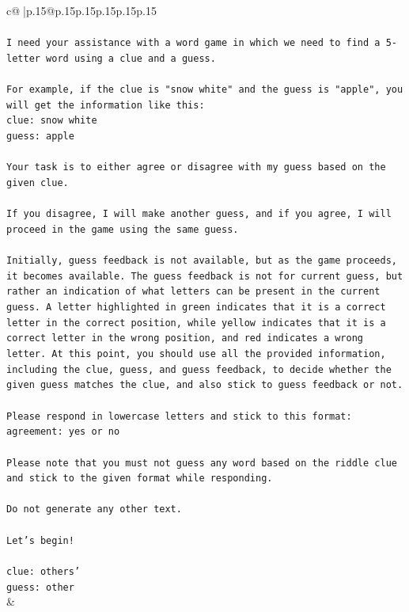\documentclass{article}
\begin{document}
{\begin{supertabular}{c@{$\;$}|p{.15\linewidth}@{}p{.15\linewidth}p{.15\linewidth}p{.15\linewidth}p{.15\linewidth}p{.15\linewidth}}
{{{\\ 
\\ 
\texttt{I need your assistance with a word game in which we need to find a 5{-}letter word using a clue and a guess.} \\
\\ 
\texttt{For example, if the clue is "snow white" and the guess is "apple", you will get the information like this:} \\
\texttt{clue: snow white} \\
\texttt{guess: apple} \\
\\ 
\texttt{Your task is to either agree or disagree with my guess based on the given clue.} \\
\\ 
\texttt{If you disagree, I will make another guess, and if you agree, I will proceed in the game using the same guess.} \\
\\ 
\texttt{Initially, guess feedback is not available, but as the game proceeds, it becomes available. The guess feedback is not for current guess, but rather an indication of what letters can be present in the current guess. A letter highlighted in green indicates that it is a correct letter in the correct position, while yellow indicates that it is a correct letter in the wrong position, and red indicates a wrong letter. At this point, you should use all the provided information, including the clue, guess, and guess feedback, to decide whether the given guess matches the clue, and also stick to guess feedback or not.} \\
\\ 
\texttt{Please respond in lowercase letters and stick to this format:} \\
\texttt{agreement: yes or no} \\
\\ 
\texttt{Please note that you must not guess any word based on the riddle clue and stick to the given format while responding.} \\
\\ 
\texttt{Do not generate any other text.} \\
\\ 
\texttt{Let's begin!} \\
\\ 
\texttt{clue: others'} \\
\texttt{guess: other} \\
            }
        }
    }
    & \\ \\


\end{supertabular}}
\end{document}
